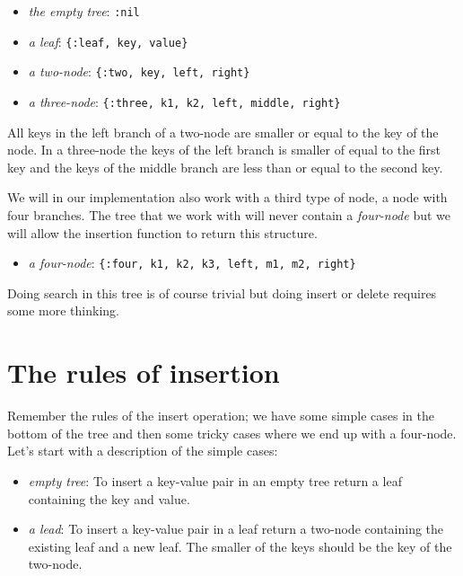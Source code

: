 \documentclass[a4paper,11pt]{article}
\begin{document}
\begin{itemize}
    \item {\em the empty tree}: {\tt :nil}
    \item {\em a leaf}: {\tt \{:leaf, key, value\}}
    \item {\em a two-node}: {\tt \{:two, key, left, right\}}
    \item {\em a three-node}: {\tt \{:three, k1, k2, left, middle, right\}}
\end{itemize}

All keys in the left branch of a two-node are smaller or equal to the
key of the node. In a three-node the keys of the left branch is
smaller of equal to the first key and the keys of the middle branch are
less than or equal to the second key.

We will in our implementation also work with a third type of node, a
node with four branches. The tree that we work with will never contain
a {\em four-node} but we will allow the insertion function to return
this structure.

\begin{itemize}
    \item {\em a four-node}: {\tt \{:four, k1, k2, k3, left, m1, m2, right\}}
\end{itemize}

Doing search in this tree is of course trivial but doing insert or
delete requires some more thinking.



\section{The rules of insertion}

Remember the rules of the insert operation; we have some simple cases
in the bottom of the tree and then some tricky cases where we end up
with a four-node. Let's start with a description of the simple cases:

\begin{itemize}
    \item {\em empty tree}: To insert a key-value pair in an empty tree return a leaf containing the key and value.
    \item {\em a lead}: To insert a key-value pair in a leaf return a
    two-node containing the existing leaf and a new leaf. The smaller
    of the keys should be the key of the two-node.
\end{itemize}
\end{document}
